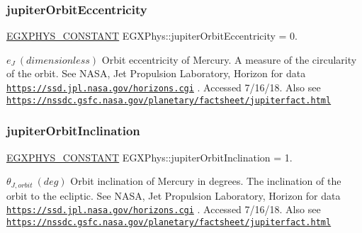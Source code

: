 \subsubsection{\texorpdfstring{jupiter\+Orbit\+Eccentricity}{jupiterOrbitEccentricity}}
{\footnotesize\ttfamily \mbox{\hyperlink{group___e_g_x_phys-_constants-_macros_ga76980d288494ce1714c9ac68a95ba702}{E\+G\+X\+P\+H\+Y\+S\+\_\+\+C\+O\+N\+S\+T\+A\+NT}} E\+G\+X\+Phys\+::jupiter\+Orbit\+Eccentricity = 0.}

$ e_{J} \ (dimensionless)$ Orbit eccentricity of Mercury. A measure of the circularity of the orbit. See N\+A\+SA, Jet Propulsion Laboratory, Horizon for data \href{https://ssd.jpl.nasa.gov/horizons.cgi}{\tt https\+://ssd.\+jpl.\+nasa.\+gov/horizons.\+cgi} . Accessed 7/16/18. Also see \href{https://nssdc.gsfc.nasa.gov/planetary/factsheet/jupiterfact.html}{\tt https\+://nssdc.\+gsfc.\+nasa.\+gov/planetary/factsheet/jupiterfact.\+html} \mbox{\label{group___e_g_x_phys-_constants-_astrophysics-_solar_system-_mercury-_orbit_ga547b86c72473737c6c41220973a5450b}} 
\subsubsection{\texorpdfstring{jupiter\+Orbit\+Inclination}{jupiterOrbitInclination}}
{\footnotesize\ttfamily \mbox{\hyperlink{group___e_g_x_phys-_constants-_macros_ga76980d288494ce1714c9ac68a95ba702}{E\+G\+X\+P\+H\+Y\+S\+\_\+\+C\+O\+N\+S\+T\+A\+NT}} E\+G\+X\+Phys\+::jupiter\+Orbit\+Inclination = 1.}

$ \theta_{J,orbit} \ (deg)$ Orbit inclination of Mercury in degrees. The inclination of the orbit to the ecliptic. See N\+A\+SA, Jet Propulsion Laboratory, Horizon for data \href{https://ssd.jpl.nasa.gov/horizons.cgi}{\tt https\+://ssd.\+jpl.\+nasa.\+gov/horizons.\+cgi} . Accessed 7/16/18. Also see \href{https://nssdc.gsfc.nasa.gov/planetary/factsheet/jupiterfact.html}{\tt https\+://nssdc.\+gsfc.\+nasa.\+gov/planetary/factsheet/jupiterfact.\+html} \mbox{\label{group___e_g_x_phys-_constants-_astrophysics-_solar_system-_mercury-_orbit_ga7eb6c0d478ae5c7ad6ae94bfcb9c47d9}} 
